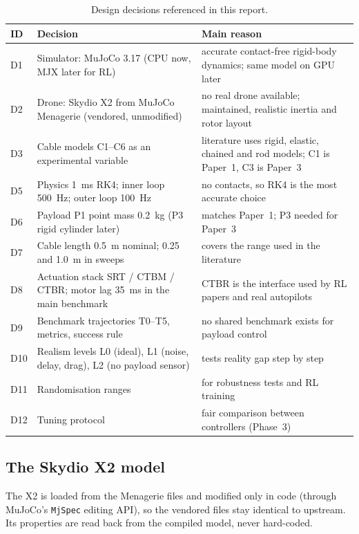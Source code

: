 \documentclass[11pt,a4paper]{article}
\newcommand{\code}[1]{\texttt{\small #1}}
\begin{document}
\begin{table}[htbp]
\centering\small
\begin{tabularx}{\textwidth}{@{}l X X@{}}
\toprule
ID & Decision & Main reason \\
\midrule
D1 & Simulator: MuJoCo 3.17 (CPU now, MJX later for RL) & accurate contact-free rigid-body dynamics; same model on GPU later \\
D2 & Drone: Skydio X2 from MuJoCo Menagerie (vendored, unmodified) & no real drone available; maintained, realistic inertia and rotor layout \\
D3 & Cable models C1--C6 as an experimental variable & literature uses rigid, elastic, chained and rod models; C1 is Paper~1, C3 is Paper~3 \\
D5 & Physics 1~ms RK4; inner loop 500~Hz; outer loop 100~Hz & no contacts, so RK4 is the most accurate choice \\
D6 & Payload P1 point mass 0.2~kg (P3 rigid cylinder later) & matches Paper~1; P3 needed for Paper~3 \\
D7 & Cable length 0.5~m nominal; 0.25 and 1.0~m in sweeps & covers the range used in the literature \\
D8 & Actuation stack SRT / CTBM / CTBR; motor lag 35~ms in the main benchmark & CTBR is the interface used by RL papers and real autopilots \\
D9 & Benchmark trajectories T0--T5, metrics, success rule & no shared benchmark exists for payload control \\
D10 & Realism levels L0 (ideal), L1 (noise, delay, drag), L2 (no payload sensor) & tests reality gap step by step \\
D11 & Randomisation ranges & for robustness tests and RL training \\
D12 & Tuning protocol & fair comparison between controllers (Phase~3) \\
\bottomrule
\end{tabularx}
\caption{Design decisions referenced in this report.}
\label{tab:decisions}
\end{table}

\subsection{The Skydio X2 model}
The X2 is loaded from the Menagerie files and modified only in code (through MuJoCo's \code{MjSpec} editing API), so
the vendored files stay identical to upstream. Its properties are read back from the compiled model, never hard-coded.
\end{document}
